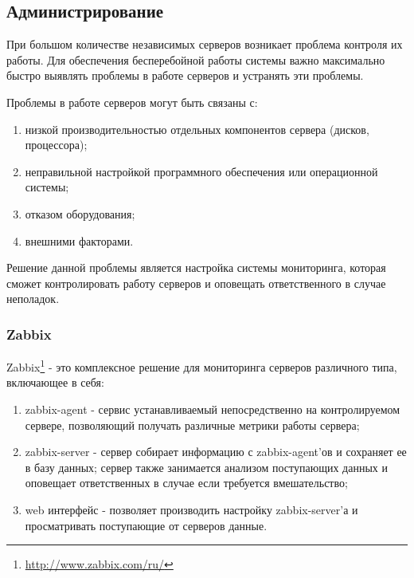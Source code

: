 \subsection{Администрирование}
При большом количестве независимых серверов возникает проблема контроля их
работы. Для обеспечения бесперебойной работы системы важно максимально быстро
выявлять проблемы в работе серверов и устранять эти проблемы.
	
Проблемы в работе серверов могут быть связаны с:
\begin{enumerate}
  \item низкой производительностью отдельных компонентов сервера (дисков, процессора);
  \item неправильной настройкой программного обеспечения или операционной
системы; 
  \item отказом оборудования;
  \item внешними факторами.
\end{enumerate}

Решение данной проблемы является настройка системы мониторинга, которая сможет
контролировать работу серверов и оповещать ответственного в случае неполадок.	

\subsubsection{Zabbix}
Zabbix\footnote{
	\url{http://www.zabbix.com/ru/}
} - это комплексное решение для мониторинга серверов различного типа,
включающее в себя:
\begin{enumerate}
  \item zabbix-agent - сервис устанавливаемый непосредственно на контролируемом сервере, позволяющий получать различные метрики работы сервера;
  \item zabbix-server - сервер собирает информацию с zabbix-agent’ов и сохраняет
ее в базу данных; сервер также занимается анализом поступающих данных и оповещает ответственных в случае если требуется вмешательство; 
  \item web интерфейс - позволяет производить настройку zabbix-server’а и
просматривать поступающие от серверов данные.
\end{enumerate}